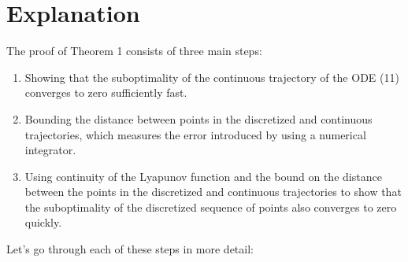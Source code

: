 \section{Explanation}
The proof of Theorem 1 consists of three main steps:

    \begin{enumerate}
        \item Showing that the suboptimality of the continuous trajectory of the ODE (11) converges to zero sufficiently fast.

        \item Bounding the distance between points in the discretized and continuous trajectories, which measures the error introduced by using a numerical integrator.

        \item Using continuity of the Lyapunov function and the bound on the distance between the points in the discretized and continuous trajectories to show that the suboptimality of the discretized sequence of points also converges to zero quickly.
    \end{enumerate}

Let's go through each of these steps in more detail:

